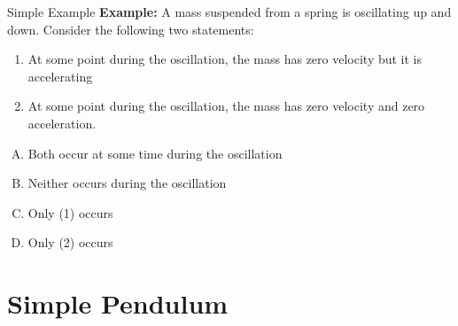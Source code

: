 \documentclass[12pt,compress,aspectratio=169]{beamer}
\begin{document}
\begin{frame}{Simple Example}
  \textbf{Example:} A mass suspended from a spring is oscillating up and
  down. Consider the following two statements:
  \begin{enumerate}
  \item At some point during the oscillation, the mass has zero velocity but it
    is accelerating
  \item At some point during the oscillation, the mass has zero velocity and
    zero acceleration.
  \end{enumerate}

  \begin{enumerate}[(A)]
  \item Both occur at some time during the oscillation
  \item Neither occurs during the oscillation
  \item Only (1) occurs
  \item Only (2) occurs
  \end{enumerate}
\end{frame}






\section{Simple Pendulum}
\end{document}
